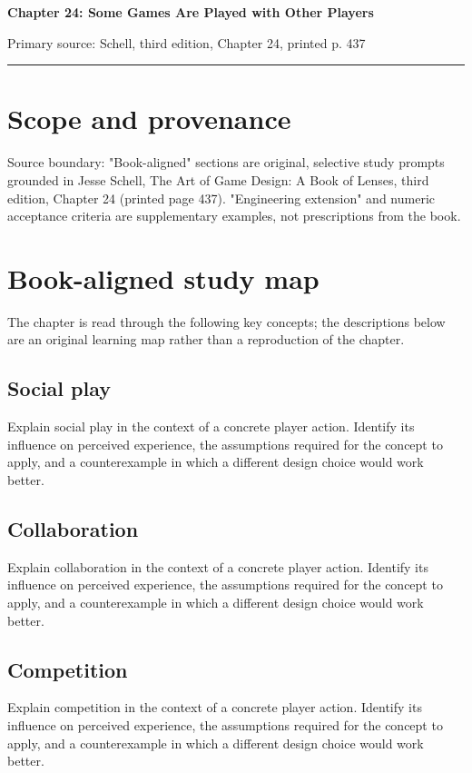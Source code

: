\documentclass[11pt]{article}
\begin{document}
{\huge\bfseries\color{suiteblue} Chapter 24: Some Games Are Played with Other Players}\par
\vspace{0.15in}
{\normalsize\color{suitegray} Primary source: Schell, third edition, Chapter 24, printed p. 437}\par
\vspace{0.15in}\hrule\vspace{0.15in}

\section{Scope and provenance}
Source boundary: "Book-aligned" sections are original, selective study prompts grounded in Jesse Schell, The Art of Game Design: A Book of Lenses, third edition, Chapter 24 (printed page 437). "Engineering extension" and numeric acceptance criteria are supplementary examples, not prescriptions from the book.


\section{Book-aligned study map}
The chapter is read through the following key concepts; the descriptions below are an original learning map rather than a reproduction of the chapter.


\subsection{Social play}
Explain social play in the context of a concrete player action. Identify its influence on perceived experience, the assumptions required for the concept to apply, and a counterexample in which a different design choice would work better.


\subsection{Collaboration}
Explain collaboration in the context of a concrete player action. Identify its influence on perceived experience, the assumptions required for the concept to apply, and a counterexample in which a different design choice would work better.


\subsection{Competition}
Explain competition in the context of a concrete player action. Identify its influence on perceived experience, the assumptions required for the concept to apply, and a counterexample in which a different design choice would work better.
\end{document}
